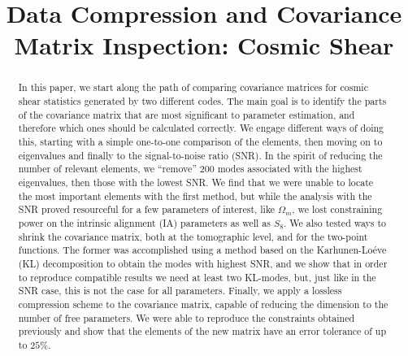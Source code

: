 \documentclass[twocolumn]{\docclass}
\begin{document}
	
	\title{Data Compression and Covariance Matrix Inspection: Cosmic Shear}
	
	\maketitlepre
	
	\begin{abstract}
		
		
		In this paper, we start along the path of comparing covariance matrices for cosmic shear statistics generated by two different codes. The main goal is to identify the parts of the covariance matrix that are most significant to parameter estimation, and therefore which ones should be calculated correctly. We engage different ways of doing this, starting with a simple one-to-one comparison of the elements, then moving on to eigenvalues and finally to the signal-to-noise ratio (SNR). In the spirit of reducing the number of relevant elements, we “remove” 200 modes associated with the highest eigenvalues, then those with the lowest SNR. We find that we were unable to locate the most important elements with the first method, but while the analysis with the SNR proved resourceful for a few parameters of interest, like $\Omega_m$, we lost constraining power on the intrinsic alignment (IA) parameters as well as $S_8$. We also tested ways to shrink the covariance matrix, both at the tomographic level, and for the two-point functions. The former was accomplished using a method based on the Karhunen-Lo\'eve (KL) decomposition to obtain the modes with highest SNR, and we show that in order to reproduce compatible results we need at least two KL-modes, but, just like in the SNR case, this is not the case for all parameters. Finally, we apply a lossless compression scheme to the covariance matrix, capable of reducing the dimension to the number of free parameters. We were able to reproduce the constraints obtained previously and show that the elements of the new matrix have an error tolerance of up to $25\%$.
		
	\end{abstract}
	
\end{document}
